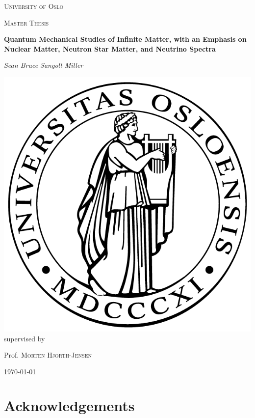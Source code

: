 \documentclass[10pt]{report}
\begin{document}
	
	\begin{titlepage}
		\centering
		{\scshape\LARGE University of Oslo \par}
		\vspace{1cm}
		{\scshape\Large Master Thesis\par}
		\vspace{1.5cm}
		{\huge\bfseries Quantum Mechanical Studies of Infinite Matter, with an Emphasis on Nuclear Matter, Neutron Star Matter, and Neutrino Spectra\par}
		\vspace{2cm}
		{\Large\itshape Sean Bruce Sangolt Miller\par}
		\vfill
		\includegraphics*[scale=0.2]{posliten.png}
		\vfill
		supervised by\par
		Prof. \textsc{Morten Hjorth-Jensen}\par
		
		\vfill
		
		{\large \today\par}
	\end{titlepage}
	
	\chapter*{Acknowledgements}
	
\end{document}

